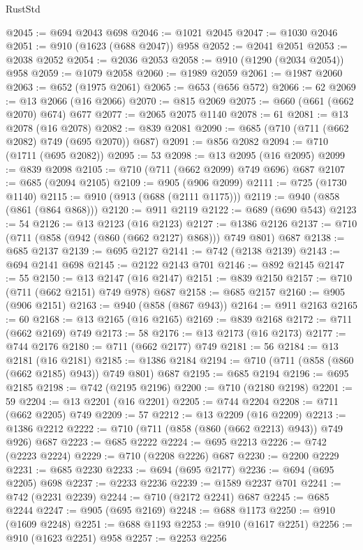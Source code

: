 \begin{lexlean}{RustStd}
\begin{coremodule}
{\begin{coremodule}
{{{{{{{{{{{{{{{{{{{{@2045 := @694 @2043 @698
@2046 := @1021 @2045
@2047 := @1030 @2046
@2051 := @910 (@1623 (@688 @2047)) @958
@2052 := @2041 @2051
@2053 := @2038 @2052
@2054 := @2036 @2053
@2058 := @910 (@1290 (@2034 @2054)) @958
@2059 := @1079 @2058
@2060 := @1989 @2059
@2061 := @1987 @2060
@2063 := @652 (@1975 @2061)
@2065 := @653 (@656 @572)
@2066 := 62
@2069 := @13 @2066 (@16 @2066)
@2070 := @815 @2069
@2075 := @660 (@661 (@662 @2070) @674) @677
@2077 := @2065 @2075 @1140
@2078 := 61
@2081 := @13 @2078 (@16 @2078)
@2082 := @839 @2081
@2090 := @685 (@710 (@711 (@662 @2082) @749 (@695 @2070)) @687)
@2091 := @856 @2082
@2094 := @710 (@1711 (@695 @2082))
@2095 := 53
@2098 := @13 @2095 (@16 @2095)
@2099 := @839 @2098
@2105 := @710 (@711 (@662 @2099) @749 @696) @687
@2107 := @685 (@2094 @2105)
@2109 := @905 (@906 @2099)
@2111 := @725 (@1730 @1140)
@2115 := @910 (@913 (@688 (@2111 @1175)))
@2119 := @940 (@858 (@861 (@864 @868)))
@2120 := @911 @2119
@2122 := @689 (@690 @543)
@2123 := 54
@2126 := @13 @2123 (@16 @2123)
@2127 := @1386 @2126
@2137 := @710 (@711 (@858 (@942 (@860 (@662 @2127) @868))) @749 @801) @687
@2138 := @685 @2137
@2139 := @695 @2127
@2141 := @742 (@2138 @2139)
@2143 := @694 @2141 @698
@2145 := @2122 @2143 @701
@2146 := @892 @2145
@2147 := 55
@2150 := @13 @2147 (@16 @2147)
@2151 := @839 @2150
@2157 := @710 (@711 (@662 @2151) @749 @978) @687
@2158 := @685 @2157
@2160 := @905 (@906 @2151)
@2163 := @940 (@858 (@867 @943))
@2164 := @911 @2163
@2165 := 60
@2168 := @13 @2165 (@16 @2165)
@2169 := @839 @2168
@2172 := @711 (@662 @2169) @749
@2173 := 58
@2176 := @13 @2173 (@16 @2173)
@2177 := @744 @2176
@2180 := @711 (@662 @2177) @749
@2181 := 56
@2184 := @13 @2181 (@16 @2181)
@2185 := @1386 @2184
@2194 := @710 (@711 (@858 (@860 (@662 @2185) @943)) @749 @801) @687
@2195 := @685 @2194
@2196 := @695 @2185
@2198 := @742 (@2195 @2196)
@2200 := @710 (@2180 @2198)
@2201 := 59
@2204 := @13 @2201 (@16 @2201)
@2205 := @744 @2204
@2208 := @711 (@662 @2205) @749
@2209 := 57
@2212 := @13 @2209 (@16 @2209)
@2213 := @1386 @2212
@2222 := @710 (@711 (@858 (@860 (@662 @2213) @943)) @749 @926) @687
@2223 := @685 @2222
@2224 := @695 @2213
@2226 := @742 (@2223 @2224)
@2229 := @710 (@2208 @2226) @687
@2230 := @2200 @2229
@2231 := @685 @2230
@2233 := @694 (@695 @2177)
@2236 := @694 (@695 @2205) @698
@2237 := @2233 @2236
@2239 := @1589 @2237 @701
@2241 := @742 (@2231 @2239)
@2244 := @710 (@2172 @2241) @687
@2245 := @685 @2244
@2247 := @905 (@695 @2169)
@2248 := @688 @1173
@2250 := @910 (@1609 @2248)
@2251 := @688 @1193
@2253 := @910 (@1617 @2251)
@2256 := @910 (@1623 @2251) @958
@2257 := @2253 @2256
}}}}}}}}}}}}}}}}}}}}
\end{coremodule}}
\end{coremodule}
\end{lexlean}
